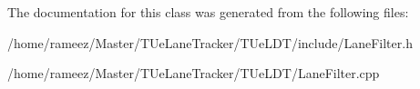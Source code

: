 The documentation for this class was generated from the following files\-:\begin{DoxyCompactItemize}
\item 
/home/rameez/\-Master/\-T\-Ue\-Lane\-Tracker/\-T\-Ue\-L\-D\-T/include/Lane\-Filter.\-h\item 
/home/rameez/\-Master/\-T\-Ue\-Lane\-Tracker/\-T\-Ue\-L\-D\-T/Lane\-Filter.\-cpp\end{DoxyCompactItemize}
